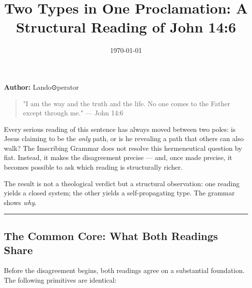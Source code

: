 \documentclass[12pt,a4paper]{article}
\begin{document}
\title{Two Types in One Proclamation: A Structural Reading of John 14:6}
\date{\today}

\maketitle

\textbf{Author:} Lando\otimes⊙perator

\begin{quote}
"I am the way and the truth and the life. No one comes to the Father except through me."
--- John 14:6

\end{quote}

Every serious reading of this sentence has always moved between two poles: is Jesus claiming to be the \emph{only} path, or is he revealing a path that others can also walk? The Imscribing Grammar does not resolve this hermeneutical question by fiat. Instead, it makes the disagreement precise --- and, once made precise, it becomes possible to ask which reading is structurally richer.

The result is not a theological verdict but a structural observation: one reading yields a closed system; the other yields a self-propagating type. The grammar shows \emph{why}.

\begin{center}
\rule{0.5\textwidth}{0.4pt}
\end{center}

\subsection{The Common Core: What Both Readings Share}

Before the disagreement begins, both readings agree on a substantial foundation. The following primitives are identical:
\end{document}
